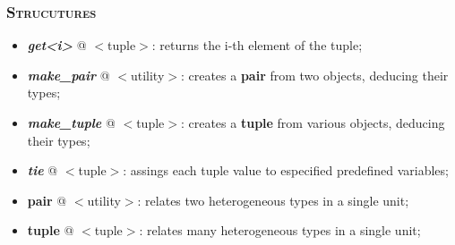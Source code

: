 \documentclass[10pt]{article}
\begin{document}
\begin{multicols*}{5}
{{\subsubsection*{\textsc{Strucutures}} 
\begin{itemize}[leftmargin=*,topsep=0.25pt]
  \setlength\itemsep{-1.8pt}
\item  \emph{{\textbf{get<i>}}} @ $<$tuple$>$: returns the i-th element of the tuple;  
\item  \emph{\textbf{make\_pair}} @ $<$utility$>$: creates a \textbf{pair} from two objects, deducing their types; 
\item  \emph{\textbf{make\_tuple}} @ $<$tuple$>$: creates a \textbf{tuple} from various objects, deducing their types; 
\item  \emph{\textbf{tie}} @ $<$tuple$>$: assings each tuple value to especified predefined variables; 
\item  {\textbf{pair}} @ $<$utility$>$: relates two heterogeneous types in a single unit; 
\item  {\textbf{tuple}} @ $<$tuple$>$: relates many heterogeneous types in a single unit;
\end{itemize}



}

}


\end{multicols*}
\end{document}
